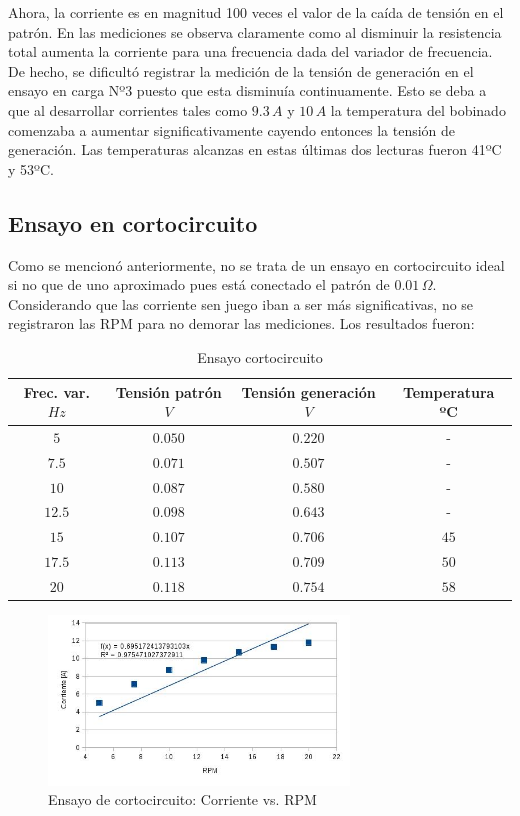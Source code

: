 \documentclass[a4paper,11pt,twoside]{IT-CNEA}
\begin{document}
\par Ahora, la corriente es en magnitud 100 veces el valor de la caída de tensión en el patrón. En las mediciones se observa claramente como al disminuir la resistencia total aumenta la corriente para una frecuencia dada del variador de frecuencia. De hecho, se dificultó registrar la medición de la tensión de generación en el ensayo en carga Nº3 puesto que esta disminuía continuamente. Esto se deba a que al desarrollar corrientes tales como $9.3\,A$ y $10\,A$ la temperatura del bobinado comenzaba a aumentar significativamente cayendo entonces la tensión de generación. Las temperaturas alcanzas en estas últimas dos lecturas fueron 41ºC y 53ºC.
\subsection{Ensayo en cortocircuito}
Como se mencionó anteriormente, no se trata de un ensayo en cortocircuito ideal si no que de uno aproximado pues está conectado el patrón de $0.01\,\varOmega$. Considerando que las corriente sen juego iban a ser más significativas, no se registraron las RPM para no demorar las mediciones. Los resultados fueron:
\begin{table}[h!]
\centering
\caption{Ensayo cortocircuito}
\label{tabla:cortocircuito}
\begin{tabular}{|c|c|c|c|}
\hline
Frec. var. $Hz$ & Tensión patrón $V$ & Tensión generación $V$  & Temperatura ºC\\ \hline
$5$&$0.050$&$0.220$& - \\ \hline
$7.5$&$0.071$&$0.507$& - \\ \hline
$10$&$0.087$&$0.580$& - \\ \hline
$12.5$&$0.098$&$0.643$& - \\ \hline
$15$&$0.107$&$0.706$&$45$ \\ \hline
$17.5$&$0.113$&$0.709$&$50$ \\ \hline
$20$&$0.118$&$0.754$&$58$ \\ \hline

\end{tabular}
\end{table}
\begin{figure}[h!]
\centering
\includegraphics[width=8cm]{Figuras/CorrienteCortocircuito.jpg}
\caption{Ensayo de cortocircuito: Corriente vs. RPM}
\label{fig:CorrienteCortocircuito}
\end{figure}
\end{document}
